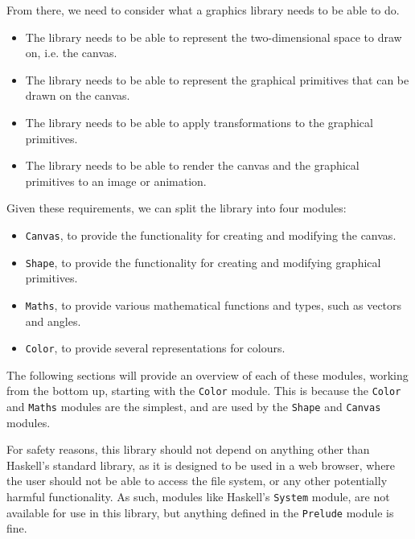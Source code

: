 \documentclass[../main.tex]{subfiles}
\begin{document}
            From there, we need to consider what a graphics library needs to be able to do.
            \begin{itemize}
                \item The library needs to be able to represent the two-dimensional space
                      to draw on, i.e. the canvas.
                \item The library needs to be able to represent the graphical primitives
                      that can be drawn on the canvas.
                \item The library needs to be able to apply transformations to the graphical
                      primitives.
                \item The library needs to be able to render the canvas and the graphical
                      primitives to an image or animation.
            \end{itemize}
            Given these requirements, we can split the library into four modules:
            \begin{itemize}
                \item \texttt{Canvas}, to provide the functionality for creating and modifying
                      the canvas.
                \item \texttt{Shape}, to provide the functionality for creating and modifying
                      graphical primitives.
                \item \texttt{Maths}, to provide various mathematical functions and types, such
                      as vectors and angles.
                \item \texttt{Color}, to provide several representations for colours.
            \end{itemize}
            The following sections will provide an overview of each of these modules,
                working from the bottom up, starting with the \texttt{Color} module.
            This is because the \texttt{Color} and \texttt{Maths} modules are the simplest,
                and are used by the \texttt{Shape} and \texttt{Canvas} modules.

            For safety reasons, this library should not depend on anything other than
                Haskell's standard library, as it is designed to be used in a web browser,
                where the user should not be able to access the file system, or any other
                potentially harmful functionality.
            As such, modules like Haskell's \texttt{System} module, are not available for
                use in this library, but anything defined in the \texttt{Prelude} module is
                fine.
\end{document}
